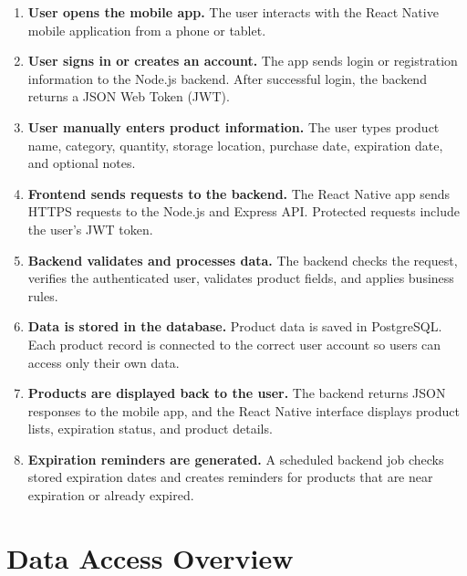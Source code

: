 \documentclass[12pt]{article}
\begin{document}
\begin{enumerate}[leftmargin=*]
    \item \textbf{User opens the mobile app.} The user interacts with the React Native mobile application from a phone or tablet.
    \item \textbf{User signs in or creates an account.} The app sends login or registration information to the Node.js backend. After successful login, the backend returns a JSON Web Token (JWT).
    \item \textbf{User manually enters product information.} The user types product name, category, quantity, storage location, purchase date, expiration date, and optional notes.
    \item \textbf{Frontend sends requests to the backend.} The React Native app sends HTTPS requests to the Node.js and Express API. Protected requests include the user's JWT token.
    \item \textbf{Backend validates and processes data.} The backend checks the request, verifies the authenticated user, validates product fields, and applies business rules.
    \item \textbf{Data is stored in the database.} Product data is saved in PostgreSQL. Each product record is connected to the correct user account so users can access only their own data.
    \item \textbf{Products are displayed back to the user.} The backend returns JSON responses to the mobile app, and the React Native interface displays product lists, expiration status, and product details.
    \item \textbf{Expiration reminders are generated.} A scheduled backend job checks stored expiration dates and creates reminders for products that are near expiration or already expired.
\end{enumerate}

\section*{Data Access Overview}
\end{document}
